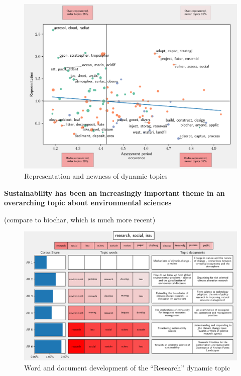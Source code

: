 \documentclass{article}
\begin{document}
\begin{linenumbers}
\begin{figure}
	\begin{center}
		\includegraphics[width=1\linewidth]{plots/ipcc_representation/ipcc_rep_new665_all.pdf}
		\caption{Representation and newness of dynamic topics}
		\label{}
	\end{center}
\end{figure}


\bigskip
\noindent\textbf{Sustainability has been an increasingly important theme in an overarching topic about environmental sciences}

(compare to biochar, which is much more recent)

\begin{figure}
	\begin{center}
		\includegraphics[width=1\linewidth]{plots/single_topic_3_11046.pdf}
		\caption{Word and document development of the ``Research'' dynamic topic}
		\label{}
	\end{center}
\end{figure}


\end{linenumbers}
\end{document}
